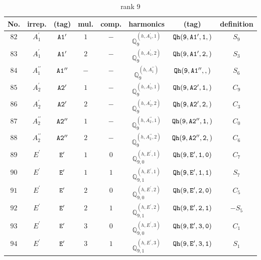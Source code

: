 \documentclass[fleqn,8pt]{jsarticle}
\begin{document}
\begin{table}[ht!]
\begin{center}
\caption{rank 9}
\renewcommand{\arraystretch}{1.3}
\begin{tabular}{cccccccc} \hline \hline
No. & irrep. & (tag) & mul. & comp. & harmonics & (tag) & definition \\ \hline
$ 82 $ & $ A_{1}^{\prime} $ & $ {\tt A1'} $ & $ 1 $ & $ - $ & $ \mathbb{Q}_{9}^{(h,A_{1}^{\prime},1)} $ & $ {\tt Qh(9,A1',1,)} $ & $ S_{9} $ \\
$ 83 $ & $ A_{1}^{\prime} $ & $ {\tt A1'} $ & $ 2 $ & $ - $ & $ \mathbb{Q}_{9}^{(h,A_{1}^{\prime},2)} $ & $ {\tt Qh(9,A1',2,)} $ & $ S_{3} $ \\
$ 84 $ & $ A_{1}^{\prime\prime} $ & $ {\tt A1''} $ & $ - $ & $ - $ & $ \mathbb{Q}_{9}^{(h,A_{1}^{\prime\prime})} $ & $ {\tt Qh(9,A1'',,)} $ & $ S_{6} $ \\
$ 85 $ & $ A_{2}^{\prime} $ & $ {\tt A2'} $ & $ 1 $ & $ - $ & $ \mathbb{Q}_{9}^{(h,A_{2}^{\prime},1)} $ & $ {\tt Qh(9,A2',1,)} $ & $ C_{9} $ \\
$ 86 $ & $ A_{2}^{\prime} $ & $ {\tt A2'} $ & $ 2 $ & $ - $ & $ \mathbb{Q}_{9}^{(h,A_{2}^{\prime},2)} $ & $ {\tt Qh(9,A2',2,)} $ & $ C_{3} $ \\
$ 87 $ & $ A_{2}^{\prime\prime} $ & $ {\tt A2''} $ & $ 1 $ & $ - $ & $ \mathbb{Q}_{9}^{(h,A_{2}^{\prime\prime},1)} $ & $ {\tt Qh(9,A2'',1,)} $ & $ C_{0} $ \\
$ 88 $ & $ A_{2}^{\prime\prime} $ & $ {\tt A2''} $ & $ 2 $ & $ - $ & $ \mathbb{Q}_{9}^{(h,A_{2}^{\prime\prime},2)} $ & $ {\tt Qh(9,A2'',2,)} $ & $ C_{6} $ \\
$ 89 $ & $ E^{\prime} $ & $ {\tt E'} $ & $ 1 $ & $ 0 $ & $ \mathbb{Q}_{9,0}^{(h,E^{\prime},1)} $ & $ {\tt Qh(9,E',1,0)} $ & $ C_{7} $ \\
$ 90 $ & $ E^{\prime} $ & $ {\tt E'} $ & $ 1 $ & $ 1 $ & $ \mathbb{Q}_{9,1}^{(h,E^{\prime},1)} $ & $ {\tt Qh(9,E',1,1)} $ & $ S_{7} $ \\
$ 91 $ & $ E^{\prime} $ & $ {\tt E'} $ & $ 2 $ & $ 0 $ & $ \mathbb{Q}_{9,0}^{(h,E^{\prime},2)} $ & $ {\tt Qh(9,E',2,0)} $ & $ C_{5} $ \\
$ 92 $ & $ E^{\prime} $ & $ {\tt E'} $ & $ 2 $ & $ 1 $ & $ \mathbb{Q}_{9,1}^{(h,E^{\prime},2)} $ & $ {\tt Qh(9,E',2,1)} $ & $ - S_{5} $ \\
$ 93 $ & $ E^{\prime} $ & $ {\tt E'} $ & $ 3 $ & $ 0 $ & $ \mathbb{Q}_{9,0}^{(h,E^{\prime},3)} $ & $ {\tt Qh(9,E',3,0)} $ & $ C_{1} $ \\
$ 94 $ & $ E^{\prime} $ & $ {\tt E'} $ & $ 3 $ & $ 1 $ & $ \mathbb{Q}_{9,1}^{(h,E^{\prime},3)} $ & $ {\tt Qh(9,E',3,1)} $ & $ S_{1} $ \\

\end{tabular}
\end{center}
\end{table}
\end{document}
